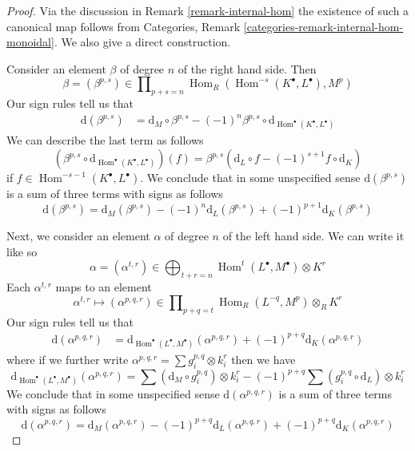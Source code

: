 \documentclass[10pt,a4paper]{amsart}
\theoremstyle{plain}
\theoremstyle{definition}
\theoremstyle{remark}
\numberwithin{equation}{subsection}
\def\Hom{\mathop{\mathrm{Hom}}\nolimits}
\begin{document}
\begin{proof}
Via the discussion in Remark \ref{remark-internal-hom} the existence
of such a canonical map follows from
Categories, Remark \ref{categories-remark-internal-hom-monoidal}.
We also give a direct construction.

\medskip\noindent
Consider an element $\beta$ of degree $n$ of the right hand side.
Then
$$
\beta = (\beta^{p, s}) \in
\prod\nolimits_{p + s = n} \Hom_R(\Hom^{-s}(K^\bullet, L^\bullet), M^p)
$$
Our sign rules tell us that
\begin{align*}
\text{d}(\beta^{p, s})
& =
\text{d}_M \circ \beta^{p, s}
- (-1)^n \beta^{p, s} \circ
\text{d}_{\Hom^\bullet(K^\bullet, L^\bullet)}
\end{align*}
We can describe the last term as follows
$$
(\beta^{p, s} \circ \text{d}_{\Hom^\bullet(K^\bullet, L^\bullet)})(f) =
\beta^{p, s}(\text{d}_L \circ f - (-1)^{s + 1} f \circ \text{d}_K)
$$
if $f \in \Hom^{-s - 1}(K^\bullet, L^\bullet)$. We conclude that in
some unspecified sense $\text{d}(\beta^{p, s})$ is a sum of three terms
with signs as follows
\begin{equation}
\label{equation-beta}
\text{d}(\beta^{p, s}) =
\text{d}_M(\beta^{p, s})
-(-1)^n\text{d}_L(\beta^{p, s}) +
(-1)^{p + 1}\text{d}_K(\beta^{p, s})
\end{equation}

\noindent
Next, we consider an element $\alpha$ of degree $n$ of the left hand side.
We can write it like so
$$
\alpha = (\alpha^{t, r}) \in
\bigoplus\nolimits_{t + r = n} \Hom^t(L^\bullet, M^\bullet) \otimes K^r
$$
Each $\alpha^{t, r}$ maps to an element
$$
\alpha^{t, r} \mapsto (\alpha^{p, q, r}) \in
\prod\nolimits_{p + q = t} \Hom_R(L^{-q}, M^p) \otimes_R K^r
$$
Our sign rules tell us that
\begin{align*}
\text{d}(\alpha^{p, q, r})
& =
\text{d}_{\Hom^\bullet(L^\bullet, M^\bullet)}(\alpha^{p, q, r})
+ (-1)^{p + q} \text{d}_K(\alpha^{p, q, r})
\end{align*}
where if we further write $\alpha^{p, q, r} = \sum g_i^{p, q} \otimes k_i^r$
then we have
$$
\text{d}_{\Hom^\bullet(L^\bullet, M^\bullet)}(\alpha^{p, q, r}) =
\sum (\text{d}_M \circ g_i^{p, q}) \otimes k_i^r
- (-1)^{p + q} \sum (g_i^{p, q} \circ \text{d}_L) \otimes k_i^r
$$
We conclude that in some unspecified sense $\text{d}(\alpha^{p, q, r})$
is a sum of three terms with signs as follows
\begin{equation}
\label{equation-alpha}
\text{d}(\alpha^{p, q, r}) =
\text{d}_M(\alpha^{p, q, r})
-(-1)^{p + q}\text{d}_L(\alpha^{p, q, r}) +
(-1)^{p + q}\text{d}_K(\alpha^{p, q, r})
\end{equation}


\end{proof}
\end{document}
